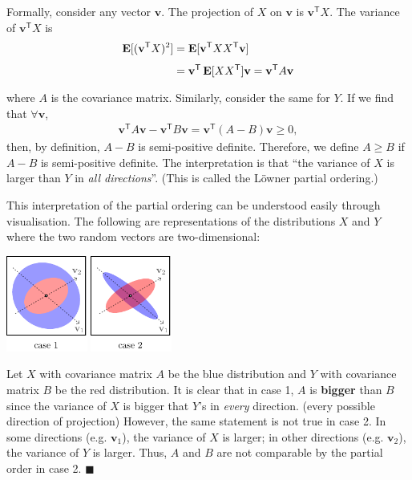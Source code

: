 \documentclass{article}
\DeclareMathOperator{\Exp}{\text{\textbf{E}}}
\newcommand{\E}[2][]{\Exp_{#1}[#2]}
\newcommand{\asDemonstrated}{\null\nobreak\hfill\ensuremath{\blacksquare}}
\newcommand{\T}{^{\mathsf{T}}}
\newcommand{\vv}{\mathbf{v}}
\begin{document}
\begin{multicols}{2}
Formally, consider any vector $\vv$.
The projection of $X$ on $\vv$ is $\vv\T X$.
The variance of $\vv\T X$ is 
\begin{align*}
	\E{(\vv\T X)^2}
	&= \E{\vv\T XX\T\vv} \\
	&= \vv\T\E{XX\T}\vv
	= \vv\T A\vv
\end{align*}
where $A$ is the covariance matrix.
Similarly, consider the same for $Y$.
If we find that $\forall\vv$,
\begin{align*}
	\vv\T A\vv - \vv\T B\vv
	= \vv\T (A - B)\vv
	\geq 0,
\end{align*}
then, by definition, $A-B$ is semi-positive definite.
Therefore, we define $A\geq B$ if $A-B$ is semi-positive definite.
The interpretation is that
``the variance of $X$ is larger than $Y$ in \emph{all directions}''.
(This is called the L\"{o}wner partial ordering.)

This interpretation of the partial ordering can be understood easily through visualisation.
The following are representations of the distributions $X$ and $Y$ where the
two random vectors are two-dimensional:
\begin{center}
	\includegraphics[width=0.2\textwidth]{figures/visual-1.pdf}
	\hspace{0.5em}
	\includegraphics[width=0.2\textwidth]{figures/visual-2.pdf}
\end{center}
Let $X$ with covariance matrix $A$ be the blue distribution and $Y$ with
covariance matrix $B$ be the red distribution.
It is clear that in case 1, $A$ is \textbf{bigger} than $B$ since the variance of $X$ is
bigger that $Y$'s in \emph{every} direction. (every possible direction of projection)
However, the same statement is not true in case 2.
In some directions (e.g.\! $\vv_1$), the variance of $X$ is larger;
in other directions (e.g.\! $\vv_2$), the variance of $Y$ is larger.
Thus, $A$ and $B$ are not comparable by the partial order in case 2.
\asDemonstrated

\end{multicols}
\end{document}
